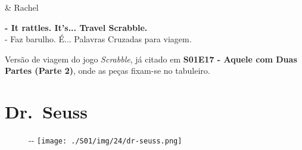 \begin{tcolorbox}[enhanced,center upper,
    drop fuzzy shadow southeast, boxrule=0.3pt,
    lower separated=false,
    colframe=black!30!dialogoBorder,colback=white]
\begin{minipage}[c]{0.16\linewidth}
   & \centering \scriptsize{Rachel}
\end{minipage}
\hfill
\begin{minipage}[c]{0.8\linewidth}
  \textbf{- It rattles. It's... Travel Scrabble.}\\
  - Faz barulho. É... Palavras Cruzadas para viagem.
\end{minipage}
\end{tcolorbox}

Versão de viagem do jogo \emph{Scrabble}, já citado em
\textbf{\textcolor{primarycolor}{S01E17 - Aquele com Duas Partes (Parte 2)}},
onde as peças fixam-se no tabuleiro.

\hypertarget{dr.-seuss}{%
\section{Dr.~Seuss}\label{dr.-seuss}}

\begin{figure}[!ht]
  \begin{adjustwidth}{-\oddsidemargin-1in}{-\rightmargin}
    \centering
    \texttt{[image: ./S01/img/24/dr-seuss.png]}
  \end{adjustwidth}
\end{figure}

